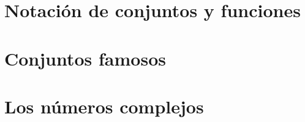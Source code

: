 \section{Notación de conjuntos y funciones}

\section{Conjuntos famosos}

\section{Los números complejos}


\newpage















